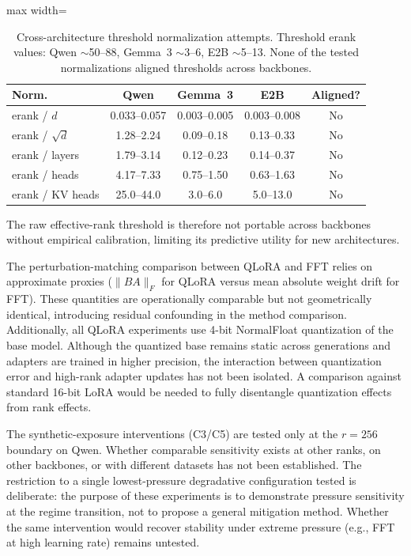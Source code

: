 \documentclass[a4paper,fleqn]{cas-dc}
\newif\ifshowchanges
\newcommand{\rev}[1]{\ifshowchanges{\color{blue}#1}\else{#1}\fi}
\renewcommand{\arraystretch}{1.8}
\begin{document}
\begin{table}[htbp]
\caption{Cross-architecture threshold normalization attempts. Threshold erank
values: Qwen ${\sim}$50--88, Gemma~3 ${\sim}$3--6, E2B ${\sim}$5--13. None of
the tested normalizations aligned thresholds across
backbones.}\label{tab:normalization}
\footnotesize
\renewcommand{\arraystretch}{1.4}
\begin{adjustbox}{max width=\columnwidth}
\begin{tabular}{@{}lcccc@{}}
\toprule
\textbf{Norm.} & \textbf{Qwen} & \textbf{Gemma~3} & \textbf{E2B} & \textbf{Aligned?} \\
\midrule
erank / $d$        & 0.033--0.057 & 0.003--0.005 & 0.003--0.008 & No \\
\addlinespace
erank / $\sqrt{d}$ & 1.28--2.24   & 0.09--0.18   & 0.13--0.33   & No \\
\addlinespace
erank / layers     & 1.79--3.14   & 0.12--0.23   & 0.14--0.37   & No \\
\addlinespace
erank / heads      & 4.17--7.33   & 0.75--1.50   & 0.63--1.63   & No \\
\addlinespace
erank / KV heads   & 25.0--44.0   & 3.0--6.0     & 5.0--13.0    & No \\
\bottomrule
\end{tabular}
\end{adjustbox}
\end{table}

\noindent The raw effective-rank threshold is
therefore not portable across backbones without empirical calibration, limiting
its predictive utility for new architectures.

The perturbation-matching comparison between QLoRA and FFT relies on approximate
proxies ($\|BA\|_F$ for QLoRA versus mean absolute weight drift for FFT). These
quantities are operationally comparable but not geometrically identical,
introducing residual confounding in the method comparison. Additionally, all
QLoRA experiments use 4-bit NormalFloat quantization of the base model. Although
the quantized base remains static across generations and adapters are trained in
higher precision, the interaction between quantization error and high-rank
adapter updates has not been isolated. A comparison against standard 16-bit LoRA
would be needed to fully disentangle quantization effects from rank effects.

The synthetic-exposure interventions (C3/C5) are tested only at the $r=256$
boundary on Qwen. Whether comparable sensitivity exists at other ranks, on other
backbones, or with different datasets has not been established. The restriction to a single \rev{lowest-pressure degradative configuration tested} is deliberate: the purpose of
these experiments is to demonstrate pressure sensitivity at the regime
transition, not to propose a general mitigation method. Whether the same
intervention would recover stability under extreme pressure (e.g., FFT at high
learning rate) remains untested.
\end{document}
